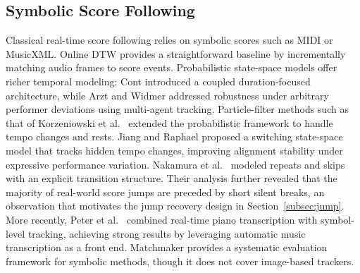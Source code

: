 \documentclass{article}
\begin{document}
\subsection{Symbolic Score Following}
Classical real-time score following relies on symbolic scores such as MIDI or MusicXML. Online DTW \cite{dixon2005line} provides a straightforward baseline by incrementally matching audio frames to score events. Probabilistic state-space models offer richer temporal modeling: Cont \cite{cont2010coupled} introduced a coupled duration-focused architecture, while Arzt and Widmer \cite{arzt2010towards} addressed robustness under arbitrary performer deviations using multi-agent tracking. Particle-filter methods such as that of Korzeniowski et al.\ \cite{korzeniowski2013tracking} extended the probabilistic framework to handle tempo changes and rests. Jiang and Raphael \cite{jiang2020score} proposed a switching state-space model that tracks hidden tempo changes, improving alignment stability under expressive performance variation. Nakamura et al.\ \cite{nakamura2016real} modeled repeats and skips with an explicit transition structure. Their analysis further revealed that the majority of real-world score jumps are preceded by short silent breaks, an observation that motivates the jump recovery design in Section~\ref{subsec:jump}. More recently, Peter et al.\ \cite{peter2025pairing} combined real-time piano transcription with symbol-level tracking, achieving strong results by leveraging automatic music transcription as a front end. Matchmaker \cite{park2025matchmaker} provides a systematic evaluation framework for symbolic methods, though it does not cover image-based trackers.
\end{document}
